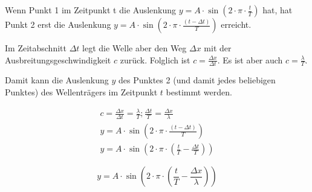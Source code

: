 \begin{minipage}{.53\textwidth}

    Wenn Punkt 1 im Zeitpunkt t die Auslenkung
    $y = A \cdot \sin(2 \cdot \pi \cdot \frac{t}{T})$ hat, hat Punkt 2 erst die 
    Auslenkung $y = A \cdot \sin(2 \cdot \pi \cdot \frac{(t - \Delta t)}{T})$ erreicht.
    \vspace{8pt}
    
    Im Zeitabschnitt $\Delta t$ legt die Welle aber den
    Weg $\Delta x$ mit der Ausbreitungsgeschwindigkeit $c$
    zurück. Folglich ist $c = \frac{\Delta x}{\Delta t}$. Es ist aber auch
    $c = \frac{\lambda}{T}$.
    \vspace{8pt}
    
    Damit kann die Auslenkung $y$ des Punktes 2 (und
    damit jedes beliebigen Punktes) des Wellenträgers im Zeitpunkt $t$ bestimmt werden.

\end{minipage}
\hspace{.05\textwidth}
\begin{minipage}{.4\textwidth}
    \begin{align}
        c = \frac{\Delta x}{\Delta t} = \frac{\lambda}{T}; \frac{\Delta t}{T} = \frac{\Delta x}{\lambda} \\
        y = A \cdot \sin(2 \cdot \pi \cdot \frac{(t - \Delta t)}{T}) \\
        y = A \cdot \sin(2 \cdot \pi \cdot (\frac{t}{T} - \frac{\Delta t}{T}))
    \end{align}

    \begin{equbox}
        \begin{equation}
            y = A \cdot \sin(2 \cdot \pi \cdot (\frac{t}{T} - \frac{\Delta x}{\lambda}))
        \end{equation}
    \end{equbox}
\end{minipage}

